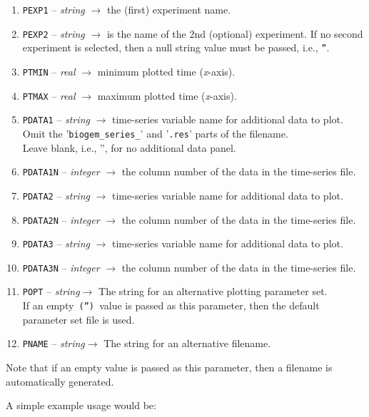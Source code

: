\documentclass[11pt,fleqn]{book} %
\begin{document}
\vspace{1mm}
\begin{enumerate}
\item \texttt{PEXP1} -- \textit{string} \(\rightarrow\) the (first) experiment name.
\item \texttt{PEXP2} -- \textit{string} \(\rightarrow\)  is the name of the 2nd (optional) experiment. If no second experiment is selected, then a null string value must be passed, i.e., \texttt{''}.
\item \texttt{PTMIN} -- \textit{real} \(\rightarrow\) minimum plotted time (\textit{x}-axis).
\item \texttt{PTMAX} -- \textit{real} \(\rightarrow\) maximum plotted time (\textit{x}-axis).
\item \texttt{PDATA1} -- \textit{string} \(\rightarrow\) time-series variable name for additional data to plot.
\\Omit the '\texttt{biogem\_series\_}' and '\texttt{.res}' parts of the filename.
\\Leave blank, i.e., '', for no additional data panel.
\item \texttt{PDATA1N} -- \textit{integer} \(\rightarrow\) the column number of the data in the time-series file.
\item \texttt{PDATA2} -- \textit{string} \(\rightarrow\) time-series variable name for additional data to plot.
\item \texttt{PDATA2N} -- \textit{integer} \(\rightarrow\) the column number of the data in the time-series file.
\item \texttt{PDATA3} -- \textit{string} \(\rightarrow\) time-series variable name for additional data to plot.
\item \texttt{PDATA3N} -- \textit{integer} \(\rightarrow\) the column number of the data in the time-series file.
\item \texttt{POPT} -- \textit{string}\(\rightarrow\) The string for an alternative plotting parameter set.
\\If an empty\texttt{ ('') }value is passed as this parameter, then the default parameter set file is used.
\item \texttt{PNAME}  -- \textit{string}\(\rightarrow\) The string for an alternative filename.
\end{enumerate}
\vspace{2mm}
Note that if an empty value is passed as this parameter, then a filename is automatically generated.

A simple example usage would be:
\end{document}
